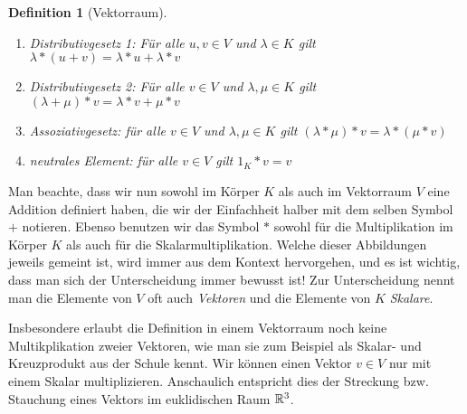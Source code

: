 \documentclass[ngerman, a4paper, 12pt]{article}
\newcounter{themcount}
\theoremstyle{plain}
\newtheorem{definition}[themcount]{Definition}
\theoremstyle{nonumberplain}
\begin{document}
\begin{definition}[Vektorraum]
\begin{enumerate}[label=(V\arabic*), leftmargin=*]
			\begin{enumerate}[label=(\alph*), noitemsep]
				\item \textit{Distributivgesetz 1}: Für alle $u,v \in V$ und $\lambda \in K$ gilt $\lambda * (u + v) = \lambda * u + \lambda * v$
				\item \textit{Distributivgesetz 2}: Für alle $v \in V$ und $\lambda, \mu \in K$ gilt $(\lambda + \mu) * v = \lambda * v + \mu * v$
				\item \textit{Assoziativgesetz}: für alle $v \in V$ und $\lambda, \mu \in K$ gilt $(\lambda * \mu) * v = \lambda * (\mu * v)$
				\item \textit{neutrales Element}: für alle $v \in V$ gilt $1_K * v = v$
			\end{enumerate}
		\end{enumerate}
	\end{definition}

	Man beachte, dass wir nun sowohl im Körper $K$ als auch im Vektorraum $V$ eine Addition definiert haben, die wir der Einfachheit halber mit dem selben Symbol $+$ notieren. Ebenso benutzen wir das Symbol $*$ sowohl für die Multiplikation im Körper $K$ als auch für die Skalarmultiplikation. Welche dieser Abbildungen jeweils gemeint ist, wird immer aus dem Kontext hervorgehen, und es ist wichtig, dass man sich der Unterscheidung immer bewusst ist! Zur Unterscheidung nennt man die Elemente von $V$ oft auch \textit{Vektoren} und die Elemente von $K$ \textit{Skalare}. 

	Insbesondere erlaubt die Definition in einem Vektorraum noch keine Multikplikation zweier Vektoren, wie man sie zum Beispiel als Skalar- und Kreuzprodukt aus der Schule kennt. Wir können einen Vektor $v \in V$ nur mit einem Skalar multiplizieren. Anschaulich entspricht dies der Streckung bzw. Stauchung eines Vektors im euklidischen Raum $\mathbb{R}^3$.
	
\end{document}
